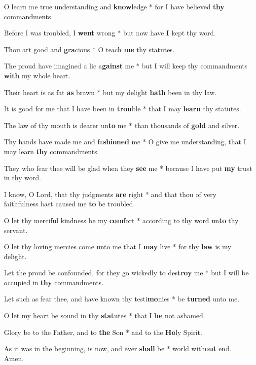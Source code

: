\begin{multicols}{2}
	O learn me true understanding and \textbf{know}ledge * for I have believed \textbf{thy} commandments.
	
	Before I was troubled, I \textbf{went} wrong * but now have \textbf{I} kept thy word.
	
	Thou art good and \textbf{gra}cious * O teach \textbf{me} thy statutes.
	
	The proud have imagined a lie a\textbf{gainst} me * but I will keep thy commandments \textbf{with} my whole heart.
	
	Their heart is as fat \textbf{as} brawn * but my delight \textbf{hath} been in thy law.
	
	It is good for me that I have been in \textbf{trou}ble * that I may \textbf{learn} thy statutes.
	
	The law of thy mouth is dearer un\textbf{to} me * than thousands of \textbf{gold} and silver.
	
	Thy hands have made me and fa\textbf{shioned} me * O give me understanding, that I may learn \textbf{thy} commandments.
	
	They who fear thee will be glad when they \textbf{see} me * because I have put \textbf{my} trust in thy word.
	
	I know, O Lord, that thy judgments \textbf{are} right * and that thou of very faithfulness hast caused me \textbf{to} be troubled.
	
	O let thy merciful kindness be my \textbf{com}fort * according to thy word un\textbf{to} thy servant.
	
	O let thy loving mercies come unto me that I \textbf{may} live * for thy \textbf{law} is my delight.
	
	Let the proud be confounded, for they go wickedly to des\textbf{troy} me * but I will be occupied in \textbf{thy} commandments.
	
	Let such as fear thee, and have known thy testi\textbf{mo}nies * be \textbf{turned} unto me.
	
	O let my heart be sound in thy \textbf{stat}utes * that I \textbf{be} not ashamed.
	
	Glory be to the Father, and to \textbf{the} Son * and to the \textbf{Ho}ly Spirit.
	
	As it was in the beginning, is now, and ever \textbf{shall} be * world with\textbf{out} end. Amen.
\end{multicols}